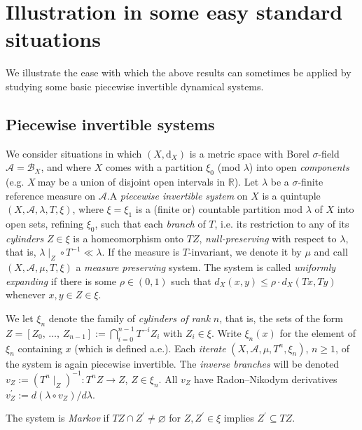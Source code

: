 \documentclass[10pt]{amsart}
\theoremstyle{definition}\newtheorem{defi}[theo]{Definition}\newtheorem{rema}[theo]{Remark}\newtheorem{exam}[theo]{Example}\newtheorem{exem}[theo]{Example}\newtheorem{nota}[theo]{Notation}
\newcommand{\clA}{\mathcal{A}}
\newcommand{\clB}{\mathcal{B}}
\newcommand{\rmd}{\mathrm{d}}
\newcommand{\bbR}{\mathbb{R}}
\begin{document}
\section{Illustration in some easy standard situations}\label{Sec_GMmaps}

We illustrate the ease with which the above results can sometimes be applied by studying some basic piecewise invertible dynamical systems.

\subsection{Piecewise invertible systems}
We consider situations in which $(X,\rmd_{X})$ is a metric space with Borel $\sigma$-field $\clA=\clB_{X}$, and where $X$ comes with a partition $\xi_{0}$ (mod $\lambda$) into open \emph{components} (e.g. $X\ $may be a union of disjoint open intervals in $\bbR$). Let $\lambda$ be a $\sigma$-finite reference measure on $\clA$.\linebreak A \emph{piecewise invertible system} on $X$ is a quintuple $(X,\clA,\lambda,T,\xi)$, where $\xi=\xi_{1}$ is a (finite or) countable partition mod $\lambda$ of $X$ into open sets, refining $\xi_{0}$, such that each \emph{branch} of $T$, i.e. its restriction to any of its \emph{cylinders} $Z\in\xi$ is a homeomorphism onto $TZ$,
\emph{null-preserving} with respect to $\lambda$, that is, $\lambda\mid _{Z}\circ T^{-1}\ll\lambda$. If the measure is $T$-invariant, we denote it by $\mu$ and call $(X,\clA,\mu,T,\xi)$ a \emph{measure preserving} system. The system is called \emph{uniformly expanding} if there is some $\rho \in(0,1)$ such that $d_{X}(x,y)\leq\rho\cdot d_{X}(Tx,Ty)$ whenever $x,y\in Z\in\xi$.

We let $\xi_{n}$ denote the family of \emph{cylinders of rank }$n$, that is, the sets of the form $Z=[Z_{0},\,\ldots,\,Z_{n-1}]:=\bigcap_{i=0}^{n-1}T^{-i} Z_{i}$ with $Z_{i}\in\xi$. Write $\xi_{n}(x)$ for the element of $\xi_{n}$ containing $x$ (which is defined a.e.). Each \emph{iterate} $(X,\clA,\mu,T^{n},\xi_{n})$, $n\geq1$, of the system is again piecewise invertible. The \emph{inverse branches} will be denoted $v_{Z}:=(T^{n}\mid_{Z})^{-1} :T^{n}Z\rightarrow Z$, $Z\in\xi_{n}$. All $v_{Z}$ have Radon--Nikodym derivatives $v_{Z}^{\prime}:=d(\lambda\circ v_{Z})/d\lambda$.

The system is \emph{Markov} if $TZ\cap Z^{\prime}\neq\varnothing$ for $Z,Z^{\prime}\in\xi$ implies $Z^{\prime}\subseteq TZ$.
\end{document}
